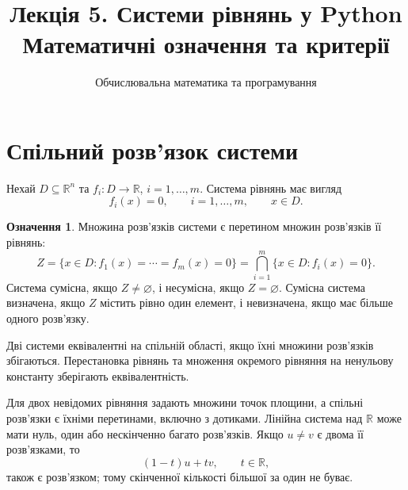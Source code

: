 \documentclass[11pt,a4paper]{article}
\title{Лекція 5. Системи рівнянь у Python\\Математичні означення та критерії}
\author{Обчислювальна математика та програмування}
\date{}
\theoremstyle{definition}
\newtheorem{definition}{Означення}[section]
\begin{document}
\maketitle

\section{Спільний розв’язок системи}
Нехай $D\subseteq\mathbb R^n$ та $f_i:D\to\mathbb R$, $i=1,\ldots,m$.
Система рівнянь має вигляд
\[
f_i(x)=0,\qquad i=1,\ldots,m,\qquad x\in D.
\]
\begin{definition}
Множина розв'язків системи є перетином множин розв'язків її рівнянь:
\[
Z=\{x\in D: f_1(x)=\cdots=f_m(x)=0\}
  =\bigcap_{i=1}^m\{x\in D:f_i(x)=0\}.
\]
Система сумісна, якщо $Z\ne\varnothing$, і несумісна, якщо $Z=\varnothing$.
Сумісна система визначена, якщо $Z$ містить рівно один елемент,
і невизначена, якщо має більше одного розв'язку.
\end{definition}
Дві системи еквівалентні на спільній області, якщо їхні множини розв'язків
збігаються. Перестановка рівнянь та множення окремого рівняння на
ненульову константу зберігають еквівалентність.

Для двох невідомих рівняння задають множини точок площини, а спільні
розв'язки є їхніми перетинами, включно з дотиками. Лінійна система
над $\mathbb R$ може мати нуль, один або нескінченно багато розв'язків.
Якщо $u\ne v$ є двома її розв'язками, то
\[
(1-t)u+tv,\qquad t\in\mathbb R,
\]
також є розв'язком; тому скінченної кількості більшої за один не буває.
\end{document}
